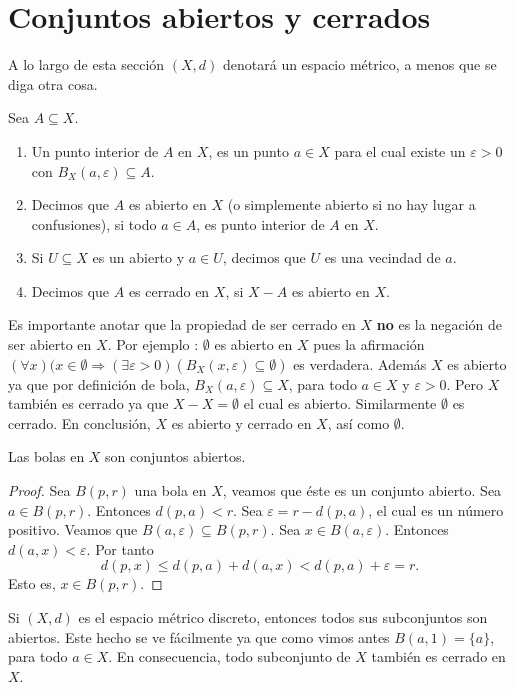 \section{Conjuntos abiertos y cerrados}
A lo largo de esta sección $(X,d)$ denotará un espacio métrico, a menos que se diga otra cosa.
\begin{definicion}
    Sea $A\subseteq X$.
    \begin{enumerate}
        \item Un punto interior de $A$ en $X$, es un punto $a\in X$ para el cual existe un $\varepsilon>0$ con $B_X(a, \varepsilon) \subseteq A$.
        \item Decimos que $A$ es abierto en $X$ (o simplemente abierto si no hay lugar a confusiones), si todo $a\in A$, es punto interior de $A$ en $X$.
        \item Si $U\subseteq X$ es un abierto y $a\in U$, decimos que $U$ es una vecindad de $a$.
        \item Decimos que $A$ es cerrado en $X$, si $X-A$ es abierto en $X$.
       
    \end{enumerate}
\end{definicion}
    Es importante anotar que la propiedad de ser cerrado en $X$ \textbf{no} es la negación de ser abierto en $X$. Por ejemplo : $\emptyset$ es abierto en $X$ pues la afirmación $(\forall x)(x\in \emptyset \Rightarrow (\exists \varepsilon>0 )(B_X(x,\varepsilon)\subseteq \emptyset)$ es verdadera. Además $X$ es abierto ya que por definición de bola, $B_X(a,\varepsilon)\subseteq X$, para todo $a\in X$ y $\varepsilon>0$. Pero  $X$ también es cerrado ya que $X-X=\emptyset$ el cual es abierto. Similarmente $\emptyset$ es cerrado. En conclusión, $X$ es abierto y cerrado en $X$, así como $\emptyset$.
   
    \begin{teorema}
    Las bolas en $X$ son conjuntos abiertos.
    \end{teorema}
    \begin{proof}
    Sea $B(p, r)$ una bola en $X$, veamos que éste es un conjunto abierto.  Sea $a\in B(p, r).$ Entonces $d(p,a)<r$. Sea $\varepsilon=r-d(p,a)$, el cual es un número positivo. Veamos que $B(a,\varepsilon)\subseteq B(p,r).$ Sea $x\in B(a,\varepsilon).$ Entonces $d(a,x)<\varepsilon.$ Por tanto
    \[d(p,x)\leq d(p,a)+d(a,x)<d(p,a)+\varepsilon=r.\]
Esto es, $x\in B(p,r)$.
\end{proof}

\begin{example}
Si $(X,d)$ es el espacio métrico discreto, entonces todos sus subconjuntos son abiertos. Este hecho se ve fácilmente ya que como vimos antes $B(a,1)=\{a\}$, para todo $a\in X$. En consecuencia, todo subconjunto de $X$ también es cerrado en $X$.
\end{example}


